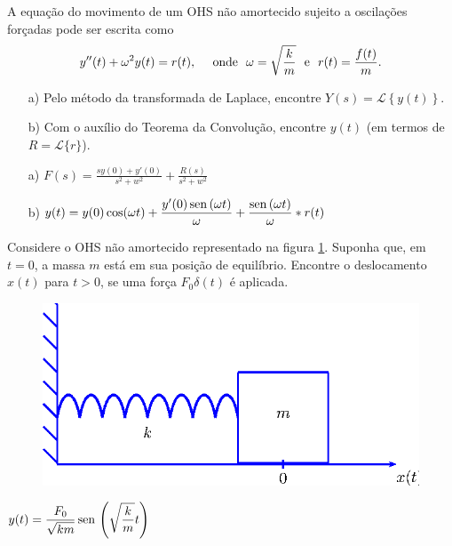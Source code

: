 \begin{exer}
A equação do movimento de um OHS não amortecido sujeito a oscilações forçadas pode ser escrita como
\begin{equation}
y''(t) + \omega^2 y(t) = r(t), \quad \hbox{ onde } \ \omega= \sqrt{\frac{k}{m}} \ \hbox{ e } \ r(t) = \frac{f(t)}{m}.
\end{equation}
\begin{itemize}
  \item[a)] Pelo método da transformada de Laplace, encontre $Y(s) = \mathcal{L} \left\{y(t)\right\}$.
  \item[b)] Com o auxílio do Teorema da Convolução, encontre $y(t)$ (em termos de $R = \mathcal{L}\{r\}$).
\end{itemize}
\end{exer}
\begin{resp}
\begin{itemize}
   \item[a)] $\displaystyle F(s) = \frac{sy(0)+y'(0)}{s^2 + w^2} + \frac{R(s)}{s^2 + w^2}$
  \item[b)] $\displaystyle y(t) = y(0) \cos (\omega t) + \frac{y'(0) \operatorname{sen}\, (\omega t)}{\omega} + \frac{\operatorname{sen}\, (\omega t)}{\omega} \ast r(t)$
\end{itemize}
\end{resp}

\begin{exer}
Considere o OHS não amortecido representado na figura \ref{massa-mola-1}. Suponha que, em $t=0$, a massa $m$ está em sua posição de equilíbrio. Encontre o deslocamento $x(t)$ para $t>0$, se uma força $F_0 \delta(t)$ é aplicada.
\begin{figure}[!ht]
\begin{center}

\includegraphics{cap_dirac_conv/pics/figura_81}\end{center}
\caption{\label{massa-mola-1}}
\end{figure} 
\end{exer}
\begin{resp}
  $\displaystyle y(t) = \frac{F_0}{\sqrt{km}} \operatorname{sen}\, \left(\sqrt{\frac{k}{m}} t\right)$
\end{resp}

